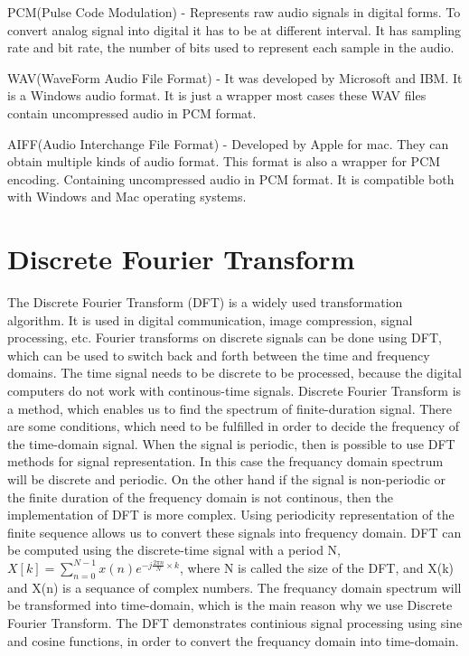 \documentclass[english,12pt,oneside,a4paper]{article}
\begin{document}
		PCM(Pulse Code Modulation) - Represents raw audio signals in digital forms. To convert analog signal into digital it has to be at different interval. It has sampling rate and bit rate, the number of bits used to represent each sample in the audio.
		
		WAV(WaveForm Audio File Format) - It was developed by Microsoft and IBM. It is a Windows audio format. It is just a wrapper most cases these WAV files contain uncompressed audio in PCM format.
		
		AIFF(Audio Interchange File Format) - Developed by Apple for mac.
		They can obtain multiple kinds of audio format. This format is also a wrapper for PCM encoding. Containing uncompressed audio in PCM format. It is compatible both with Windows and Mac operating systems.
		
		\section{Discrete Fourier Transform}
		The Discrete Fourier Transform (DFT) is a widely used transformation algorithm. It is used in digital communication, image compression, signal processing, etc. Fourier transforms on discrete signals can be done using DFT, which can be used to switch back and forth between the time and frequency domains. The time signal needs to be discrete to be processed, because the digital computers do not work with continous-time signals.
		Discrete Fourier Transform is a method, which enables us to find the spectrum of finite-duration signal. There are some conditions, which need to be fulfilled in order to decide the frequency of the time-domain signal.
		When the signal is periodic, then is possible to use DFT methods for signal representation. In this case the frequancy domain spectrum will be discrete and periodic. On the other hand if the signal is non-periodic or the finite duration of the frequency domain is not continous, then the implementation of DFT is more complex. Using periodicity representation of the finite sequence allows us to convert these signals into frequency domain. DFT can be computed using the discrete-time signal with a period N, $X[k]= \sum_{n=0}^{N-1}{x(n)}{e}^{-j\frac{2{\pi}n}{N}{\times}k}$, where N is called the size of the DFT, and X(k) and X(n) is a sequance of complex numbers. The frequancy domain spectrum will be transformed into time-domain, which is the main reason why we use Discrete Fourier Transform. The DFT demonstrates continious signal processing using sine and cosine functions, in order to convert the frequancy domain into time-domain.
\end{document}
